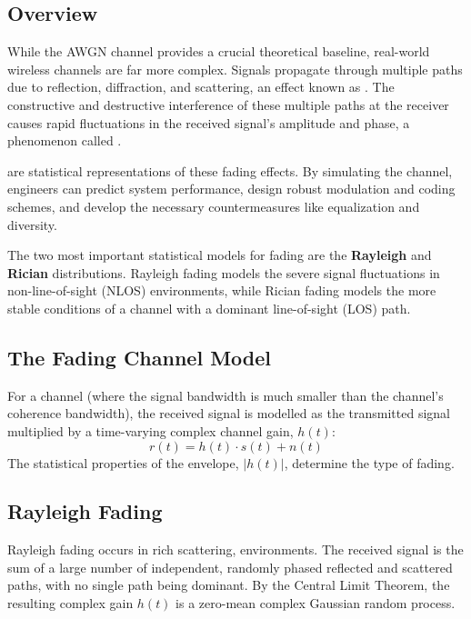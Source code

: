 \subsection{Overview}

While the AWGN channel provides a crucial theoretical baseline, real-world wireless channels are far more complex. Signals propagate through multiple paths due to reflection, diffraction, and scattering, an effect known as . The constructive and destructive interference of these multiple paths at the receiver causes rapid fluctuations in the received signal's amplitude and phase, a phenomenon called .

 are statistical representations of these fading effects. By simulating the channel, engineers can predict system performance, design robust modulation and coding schemes, and develop the necessary countermeasures like equalization and diversity.

\begin{keyconcept}
    The two most important statistical models for fading are the \textbf{Rayleigh} and \textbf{Rician} distributions. Rayleigh fading models the severe signal fluctuations in non-line-of-sight (NLOS) environments, while Rician fading models the more stable conditions of a channel with a dominant line-of-sight (LOS) path.
\end{keyconcept}


\subsection{The Fading Channel Model}

For a  channel (where the signal bandwidth is much smaller than the channel's coherence bandwidth), the received signal is modelled as the transmitted signal multiplied by a time-varying complex channel gain, $h(t)$:
\begin{equation}
    r(t) = h(t) \cdot s(t) + n(t)
\end{equation}
The statistical properties of the envelope, $|h(t)|$, determine the type of fading.


\subsection{Rayleigh Fading}

Rayleigh fading occurs in rich scattering,  environments. The received signal is the sum of a large number of independent, randomly phased reflected and scattered paths, with no single path being dominant. By the Central Limit Theorem, the resulting complex gain $h(t)$ is a zero-mean complex Gaussian random process.

